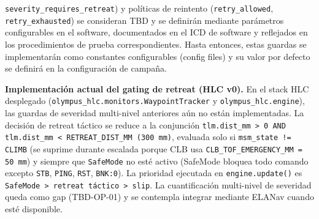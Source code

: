 \texttt{severity\_requires\_retreat}) y políticas de reintento (\texttt{retry\_allowed}, \texttt{retry\_exhausted}) se consideran TBD y se definirán mediante parámetros configurables en el software, documentados en el ICD de software y reflejados en los procedimientos de prueba correspondientes. Hasta entonces, estas guardas se implementarán como constantes configurables (config files) y su valor por defecto se definirá en la configuración de campaña.

\textbf{Implementación actual del gating de retreat (HLC v0).} En el stack HLC desplegado (\texttt{olympus\_hlc.monitors.WaypointTracker} y \texttt{olympus\_hlc.engine}), las guardas de severidad multi-nivel anteriores aún no están implementadas. La decisión de retreat táctico se reduce a la conjunción \texttt{tlm.dist\_mm > 0 AND tlm.dist\_mm < RETREAT\_DIST\_MM (300\,mm)}, evaluada solo si \texttt{msm\_state != CLIMB} (se suprime durante escalada porque CLB usa \texttt{CLB\_TOF\_EMERGENCY\_MM = 50\,mm}) y siempre que \texttt{SafeMode} no esté activo (SafeMode bloquea todo comando excepto \texttt{STB}, \texttt{PING}, \texttt{RST}, \texttt{BNK:0}). La prioridad ejecutada en \texttt{engine.update()} es \texttt{SafeMode > retreat táctico > slip}. La cuantificación multi-nivel de severidad queda como gap (TBD-OP-01) y se contempla integrar mediante ELANav cuando esté disponible.


